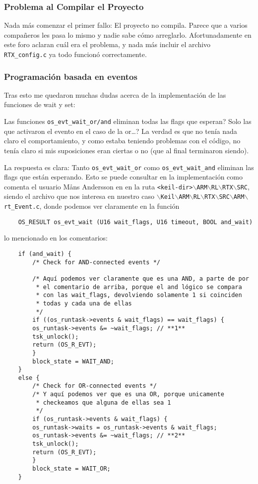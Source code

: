 \documentclass[a4paper,openright,12pt]{article}
\begin{document}
\subsubsection{Problema al Compilar el Proyecto}
Nada más comenzar el primer fallo: El proyecto no compila. Parece que a varios compañeros les pasa lo mismo y nadie sabe cómo arreglarlo. Afortunadamente en este foro
\parencite{solucionar_rtx_undefined_symbol} aclaran cuál era el problema, y nada más incluir el archivo \texttt{RTX\_config.c} ya todo funcionó correctamente.

\subsubsection{Programación basada en eventos}
Tras esto me quedaron muchas dudas acerca de la implementación de las funciones de wait y set:

Las funciones \texttt{os\_evt\_wait\_or/and} eliminan todas las flags que esperan? Solo las que activaron el evento en el caso de la or\ldots? La verdad es que no tenía nada
claro el comportamiento, y como estaba teniendo problemas con el código, no tenía claro si mis suposiciones eran ciertas o no (que al final terminaron siendo).

La respuesta es clara: Tanto \texttt{os\_evt\_wait\_or} como \texttt{os\_evt\_wait\_and} eliminan las flags que están esperando. Esto se puede consultar en la implementación como comenta
el usuario Måns Andersson en  en la ruta
\texttt{<keil-dir>$\backslash$ARM$\backslash$RL$\backslash$RTX$\backslash$SRC},
siendo el archivo que nos interesa en nuestro caso \texttt{$\backslash$Keil$\backslash$ARM$\backslash$RL$\backslash$RTX$\backslash$SRC$\backslash$ARM$\backslash$rt\_Event.c}, donde podemos
ver claramente en la función
\begin{verbatim}
    OS_RESULT os_evt_wait (U16 wait_flags, U16 timeout, BOOL and_wait)    
\end{verbatim}
lo mencionado en los comentarios:
\begin{verbatim}
    if (and_wait) {
        /* Check for AND-connected events */

        /* Aquí podemos ver claramente que es una AND, a parte de por
         * el comentario de arriba, porque el and lógico se compara
         * con las wait_flags, devolviendo solamente 1 si coinciden
         * todas y cada una de ellas
         */
        if ((os_runtask->events & wait_flags) == wait_flags) {
        os_runtask->events &= ~wait_flags; // **1**
        tsk_unlock();
        return (OS_R_EVT);
        }
        block_state = WAIT_AND;
    }
    else {
        /* Check for OR-connected events */
        /* Y aquí podemos ver que es una OR, porque unicamente
         * checkeamos que alguna de ellas sea 1
         */
        if (os_runtask->events & wait_flags) {
        os_runtask->waits = os_runtask->events & wait_flags;
        os_runtask->events &= ~wait_flags; // **2**
        tsk_unlock();
        return (OS_R_EVT);
        }
        block_state = WAIT_OR;
    }
\end{verbatim}
\end{document}
